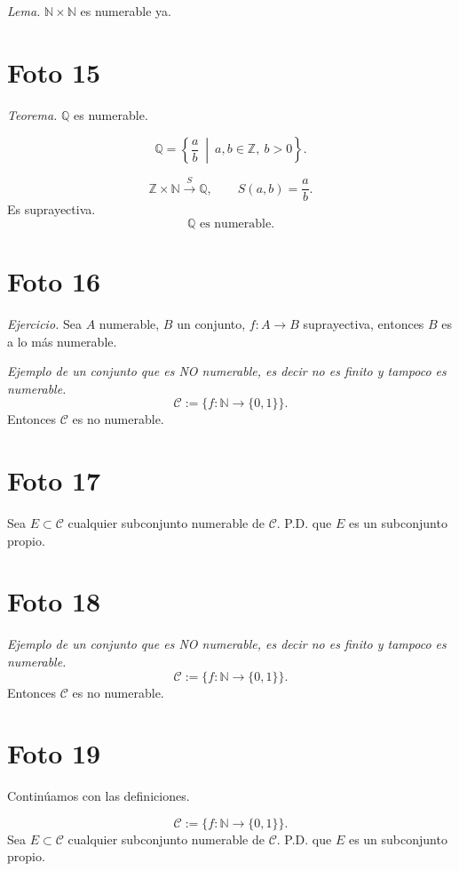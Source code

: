 \documentclass[12pt]{article}
\begin{document}
\textit{Lema.} $\mathbb N\times\mathbb N$ es numerable ya.

\section*{Foto 15}

\textit{Teorema.} $\mathbb Q$ es numerable.

\[
\mathbb Q=\left\{\frac{a}{b}\ \middle|\ a,b\in\mathbb Z,\ b>0\right\}.
\]

\[
\mathbb Z\times\mathbb N \overset{S}{\to}\mathbb Q,\qquad S(a,b)=\frac{a}{b}.
\]
Es suprayectiva.
\[
\mathbb Q \text{ es numerable.}
\]

\section*{Foto 16}

\textit{Ejercicio.}
Sea $A$ numerable, $B$ un conjunto, $f\colon A\to B$ suprayectiva, entonces $B$ es a lo m\'as numerable.

\textit{Ejemplo de un conjunto que es NO numerable, es decir no es finito y tampoco es numerable.}
\[
\mathcal C:=\{f:\mathbb N\to\{0,1\}\}.
\]
Entonces $\mathcal C$ es no numerable.

\section*{Foto 17}

Sea $E\subset \mathcal C$ cualquier subconjunto numerable de $\mathcal C$. P.D. que $E$ es un subconjunto propio.

\section*{Foto 18}

\textit{Ejemplo de un conjunto que es NO numerable, es decir no es finito y tampoco es numerable.}
\[
\mathcal C:=\{f:\mathbb N\to\{0,1\}\}.
\]
Entonces $\mathcal C$ es no numerable.

\section*{Foto 19}

Contin\'uamos con las definiciones.

\[
\mathcal C:=\{f:\mathbb N\to\{0,1\}\}.
\]
Sea $E\subset \mathcal C$ cualquier subconjunto numerable de $\mathcal C$.
P.D. que $E$ es un subconjunto propio.
\end{document}
